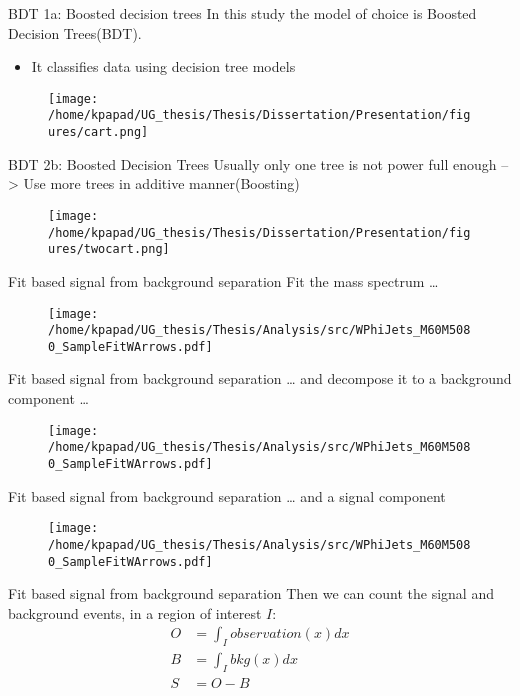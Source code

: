 \documentclass[bigger]{beamer}
\begin{document}
\begin{frame}[label={sec:orge1fe865}]{BDT 1a: Boosted decision trees}
In this study the model of choice is Boosted Decision Trees(BDT).
\begin{itemize}
\item It classifies data using decision tree models
\end{itemize}
\begin{figure}[h]
\centering
\texttt{[image: /home/kpapad/UG\_thesis/Thesis/Dissertation/Presentation/figures/cart.png]}
\end{figure}
\end{frame}
\begin{frame}[label={sec:orgc50771b}]{BDT 2b: Boosted Decision Trees}
Usually only one tree is not power full enough --> Use  more trees in additive manner(Boosting)
\begin{figure}[h]
\centering
\texttt{[image: /home/kpapad/UG\_thesis/Thesis/Dissertation/Presentation/figures/twocart.png]}
\end{figure}
\end{frame}
\begin{frame}[label={sec:orgc365121}]{Fit based signal from background separation}
Fit the mass spectrum \ldots{}
\begin{figure}[hb]
\centering
\texttt{[image: /home/kpapad/UG\_thesis/Thesis/Analysis/src/WPhiJets\_M60M5080\_SampleFitWArrows.pdf]}
\end{figure}
\end{frame}
\begin{frame}[label={sec:org835c093}]{Fit based signal from background separation}
\ldots{} and decompose it to a background component \ldots{}
\begin{figure}[hb]
\centering
\texttt{[image: /home/kpapad/UG\_thesis/Thesis/Analysis/src/WPhiJets\_M60M5080\_SampleFitWArrows.pdf]}
\end{figure}
\end{frame}
\begin{frame}[label={sec:orgbce13a2}]{Fit based signal from background separation}
\ldots{} and a signal component
\begin{figure}[hb]
\centering
\texttt{[image: /home/kpapad/UG\_thesis/Thesis/Analysis/src/WPhiJets\_M60M5080\_SampleFitWArrows.pdf]}
\end{figure}
\end{frame}
\begin{frame}[label={sec:org9889fab}]{Fit based signal from background separation}
Then we can count the signal and background events, in a region of interest \(I\):
\begin{align}
O &= \int_{I} observation(x) dx \\
B &= \int_{I} bkg(x) dx\\
S &= O - B
\end{align}
\end{frame}
\end{document}
